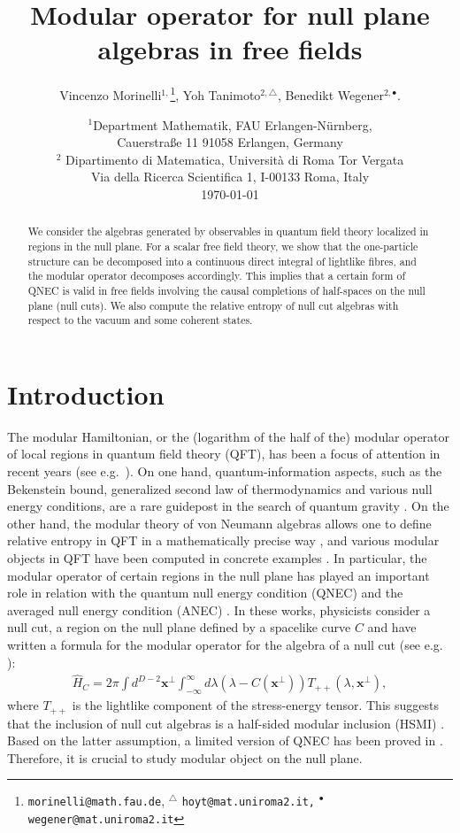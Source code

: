 \documentclass[12pt]{article}
\title{Modular operator for null plane algebras in free fields}
\date{}
\author{{Vincenzo Morinelli}${}^{1,}$\footnote{{\tt morinelli@math.fau.de}, ${}^\bigtriangleup$ {\tt hoyt@mat.uniroma2.it,} ${}^\bullet$ {\tt wegener@mat.uniroma2.it} }, { Yoh Tanimoto}${}^{2,\bigtriangleup}$, { Benedikt Wegener}${}^{2,\bullet}$.
}
\date{\small{
${}^{1}$Department Mathematik, FAU Erlangen-N\"urnberg, \\Cauerstra\ss e 11
91058 Erlangen, Germany\\
${}^{2}$ Dipartimento di Matematica, Universit\`a di Roma Tor Vergata
 \\  Via della Ricerca Scientifica 1, I-00133 Roma, Italy}\\ \today}
\def\l{\lambda}
\theoremstyle{remark}
\begin{document}
\maketitle

\begin{abstract}
 We consider the algebras generated by observables in quantum field theory localized in regions in the null plane.
 For a scalar free field theory, we show that the one-particle structure can be decomposed into a continuous direct integral
 of lightlike fibres, and the modular operator decomposes accordingly.
 This implies that a certain form of QNEC is valid in free fields involving the causal completions
 of half-spaces on the null plane (null cuts).
 We also compute the relative entropy of null cut algebras with respect to the vacuum and some coherent states.

\end{abstract}

\tableofcontents


\section{Introduction}\label{intro}
The modular Hamiltonian, or the (logarithm of the half of the) modular operator of local regions in quantum field theory (QFT),
has been a focus of attention in recent years (see e.g.~\cite{ CF18,LongoLocalised,CTT17}).
On one hand, quantum-information aspects, such as the Bekenstein bound, generalized second law of thermodynamics and various null energy conditions,
are a rare guidepost in the search of quantum gravity \cite{Casini08, Wall12, FLPW16}.
On the other hand, the modular theory of von Neumann algebras allows one to define relative entropy
in QFT in a mathematically precise way \cite{OP04}, and various modular objects in QFT have been
computed in concrete examples \cite{LX18, Hollands19, CLR20}.
In particular, the modular operator of certain regions in the null plane has played
an important role in relation with the quantum null energy condition (QNEC) and
the averaged null energy condition (ANEC) \cite{CTT17, KLLS18, CF18}.
In these works, physicists consider a null cut, a region on the null plane
defined by a spacelike curve $C$ and have written a formula for the modular operator for the algebra
of a null cut (see e.g.\! \cite[(1.5)]{CTT17}):
\begin{align}\label{eq:set}
 \hat H_C = 2\pi \int d^{D-2}\pmb{x}^\perp \int_{-\infty}^\infty d\l (\l - C(\pmb{x}^\perp))T_{++}(\l,\pmb{x}^\perp),
\end{align}
where $T_{++}$ is the lightlike component of the stress-energy tensor.
This suggests that the inclusion of null cut algebras is a half-sided modular inclusion (HSMI) \cite{Wiesbrock93-1}.
Based on the latter assumption, a limited version of QNEC has been proved in \cite{CF18}.
Therefore, it is crucial to study modular object on the null plane.
\end{document}
